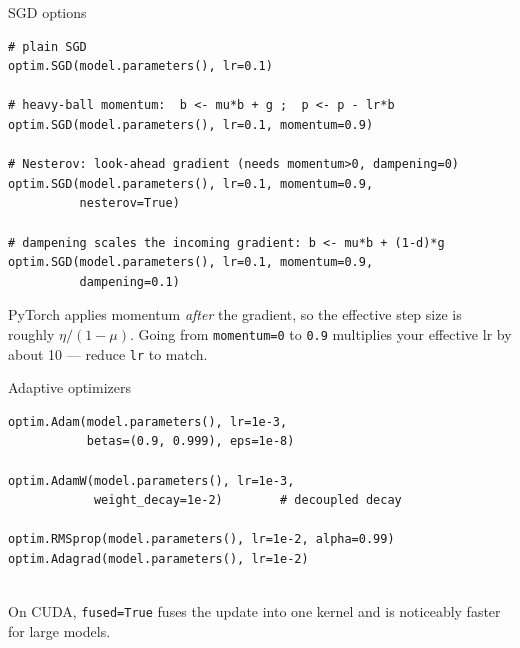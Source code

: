 \documentclass[10pt,aspectratio=169]{beamer}
\begin{document}
\begin{frame}[fragile]{SGD options}
\begin{lstlisting}
# plain SGD
optim.SGD(model.parameters(), lr=0.1)

# heavy-ball momentum:  b <- mu*b + g ;  p <- p - lr*b
optim.SGD(model.parameters(), lr=0.1, momentum=0.9)

# Nesterov: look-ahead gradient (needs momentum>0, dampening=0)
optim.SGD(model.parameters(), lr=0.1, momentum=0.9,
          nesterov=True)

# dampening scales the incoming gradient: b <- mu*b + (1-d)*g
optim.SGD(model.parameters(), lr=0.1, momentum=0.9,
          dampening=0.1)
\end{lstlisting}
PyTorch applies momentum \emph{after} the gradient, so the effective step size is roughly
$\eta/(1-\mu)$. Going from \texttt{momentum=0} to \texttt{0.9} multiplies your effective lr by
about 10 --- reduce \texttt{lr} to match.
\end{frame}

\begin{frame}[fragile]{Adaptive optimizers}
\begin{lstlisting}
optim.Adam(model.parameters(), lr=1e-3,
           betas=(0.9, 0.999), eps=1e-8)

optim.AdamW(model.parameters(), lr=1e-3,
            weight_decay=1e-2)        # decoupled decay

optim.RMSprop(model.parameters(), lr=1e-2, alpha=0.99)
optim.Adagrad(model.parameters(), lr=1e-2)


\end{lstlisting}

On CUDA, \texttt{fused=True} fuses the update into one kernel and is noticeably faster for large
models.
\end{frame}
\end{document}
